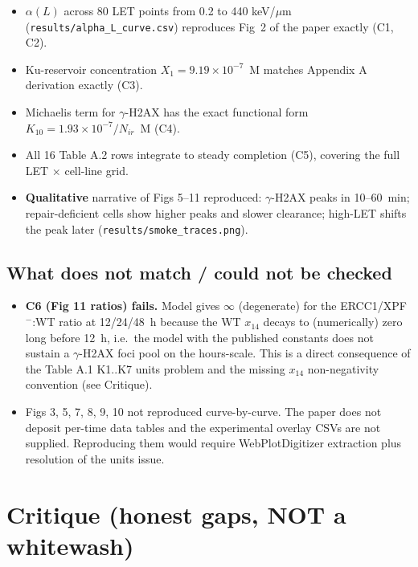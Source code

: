 \documentclass[11pt]{article}
\begin{document}
\begin{itemize}
  \item $\alpha(L)$ across 80 LET points from 0.2 to 440 keV/$\mu$m (\texttt{results/alpha\_L\_curve.csv})
        reproduces Fig~2 of the paper exactly (C1, C2).
  \item Ku-reservoir concentration $X_1=9.19\times10^{-7}$~M matches Appendix A
        derivation exactly (C3).
  \item Michaelis term for $\gamma$-H2AX has the exact functional form $K_{10}=1.93\times10^{-7}/N_{ir}$~M (C4).
  \item All 16 Table A.2 rows integrate to steady completion (C5), covering the
        full LET $\times$ cell-line grid.
  \item \textbf{Qualitative} narrative of Figs 5--11 reproduced: $\gamma$-H2AX peaks
        in 10--60~min; repair-deficient cells show higher peaks and slower clearance;
        high-LET shifts the peak later (\texttt{results/smoke\_traces.png}).
\end{itemize}

\subsection*{What does not match / could not be checked}

\begin{itemize}
  \item \textbf{C6 (Fig 11 ratios) fails.} Model gives $\infty$ (degenerate) for the
        ERCC1/XPF$^-$:WT ratio at 12/24/48~h because the WT $x_{14}$ decays to
        (numerically) zero long before 12~h, i.e.\ the model with the published
        constants does not sustain a $\gamma$-H2AX foci pool on the hours-scale.
        This is a direct consequence of the Table A.1 K1..K7 units problem and
        the missing $x_{14}$ non-negativity convention (see Critique).
  \item Figs 3, 5, 7, 8, 9, 10 not reproduced curve-by-curve. The paper does
        not deposit per-time data tables and the experimental overlay CSVs are not
        supplied. Reproducing them would require WebPlotDigitizer extraction plus
        resolution of the units issue.
\end{itemize}

\section*{Critique (honest gaps, NOT a whitewash)}
\end{document}
